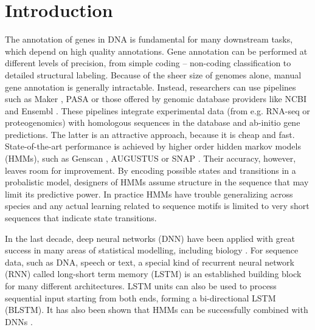 \documentclass{bioinfo}
\begin{document}
\maketitle

\section{Introduction}
The annotation of genes in DNA is fundamental for many downstream tasks, which 
depend on high quality annotations. Gene annotation can be performed at different levels 
of precision, from simple coding -- non-coding classification to detailed structural 
labeling. Because of the sheer size of genomes alone, manual gene annotation is 
generally intractable. Instead, researchers can use pipelines such as 
Maker \citep{cantarel2008maker}, PASA \citep{haas2003improving} or those 
offered by genomic database providers like NCBI 
\citep{thibaud2013eukaryotic} and Ensembl \citep{aken2016ensembl}. 
These pipelines integrate experimental data (from e.g. RNA-seq 
or proteogenomics) with homologous sequences in the database and ab-initio gene 
predictions. The latter is an attractive approach, because it is cheap and fast. 
State-of-the-art performance is achieved by higher order hidden markov models 
(HMMs), such as Genscan \citep{burge1997prediction}, AUGUSTUS \citep{stanke2003gene} 
or SNAP \citep{johnson2008snap}. Their accuracy, however, leaves room for 
improvement. By encoding possible states and transitions in a probalistic model, 
designers of HMMs assume structure in the sequence that may limit its predictive 
power. In practice HMMs have trouble generalizing across species and any actual learning 
related to sequence motifs is limited to very short sequences that indicate state transitions.

In the last decade, deep neural networks (DNN) have been applied with great success 
in many areas of statistical modelling, including biology 
\citep{ching2018opportunities}. For sequence data, such as DNA, speech or text, a 
special kind of recurrent neural network (RNN) called long-short term memory (LSTM) 
\citep{hochreiter1997long} is an established building block for many different 
architectures. LSTM units can also be used to process sequential input starting 
from both ends, forming a bi-directional LSTM (BLSTM). It has also been shown that 
HMMs can be successfully combined with DNNs \citep{liu2016novo, liu2016pedla}.
\end{document}
